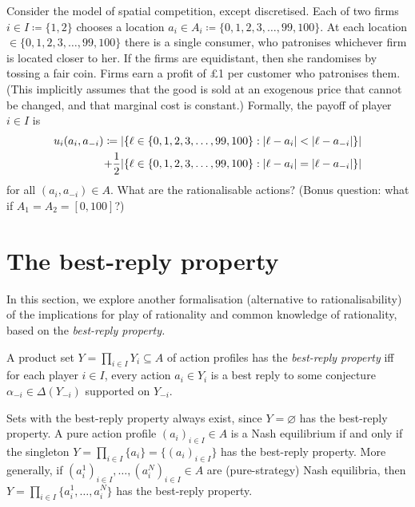 \begin{exercise}
	\label{exercise:hotelling}
	Consider the \textcite{Hotelling1929} model of spatial competition, except discretised. Each of two firms $i \in I \coloneqq \{1,2\}$ chooses a location $a_i \in A_i \coloneqq \{0,1,2,3,\dots,99,100\}$. At each location $\in \{0,1,2,3,\dots,99,100\}$ there is a single consumer, who patronises whichever firm is located closer to her. If the firms are equidistant, then she randomises by tossing a fair coin. Firms earn a profit of £1 per customer who patronises them. (This implicitly assumes that the good is sold at an exogenous price that cannot be changed, and that marginal cost is constant.) Formally, the payoff of player $i \in I$ is
	\begin{align*}
		u_i(a_i,a_{-i})
		\coloneqq{} &\abs*{ \left\{ \ell \in \{0,1,2,3,\dots,99,100\} : \abs*{ \ell - a_i } < \abs*{ \ell - a_{-i} } \right\} }
		\\
		+ \frac{1}{2} &\abs*{ \left\{ \ell \in \{0,1,2,3,\dots,99,100\} : \abs*{ \ell - a_i } = \abs*{ \ell - a_{-i} } \right\} } 
	\end{align*}
	for all $(a_i,a_{-i}) \in A$. What are the rationalisable actions? (Bonus question: what if $A_1 = A_2 = [0,100]$?)
\end{exercise}



\section{The best-reply property}
\label{dom:br_property}

In this section, we explore another formalisation (alternative to rationalisability) of the implications for play of rationality and common knowledge of rationality, based on the \emph{best-reply property.}

\begin{definition}
	\label{definition:br_set}
	A product set $Y = \prod_{i \in I} Y_i \subseteq A$ of action profiles has the \emph{best-reply property} iff for each player $i \in I$, every action $a_i \in Y_i$ is a best reply to some conjecture $\alpha_{-i} \in \Delta(Y_{-i})$ supported on $Y_{-i}$.
\end{definition}

Sets with the best-reply property always exist, since $Y=\varnothing$ has the best-reply property.
A pure action profile $(a_i)_{i \in I} \in A$ is a Nash equilibrium if and only if the singleton $Y = \prod_{i \in I} \{a_i\} = \{(a_i)_{i \in I}\}$ has the best-reply property. More generally, if $(a^1_i)_{i \in I}, \dots, (a^N_i)_{i \in I} \in A$ are (pure-strategy) Nash equilibria, then $Y = \prod_{i \in I} \{a^1_i,\dots,a^N_i\}$ has the best-reply property.


